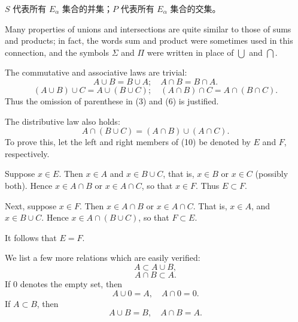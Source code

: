 \documentclass[../poma-notes.tex]{subfiles}
\begin{document}
\anote
$S$ 代表所有 $E_{\alpha}$ 集合的并集；$P$ 代表所有 $E_{\alpha}$ 集合的交集。

\begin{remarks}
  Many properties of unions and intersections are quite similar to those of sums and products; in fact,
  the words sum and product were sometimes used in this connection, and the symbols $\Sigma$ and $\Pi$
  were written in place of $\bigcup$ and $\bigcap$.

  The commutative and associative laws are trivial:
  \begin{equation}
    A \cup B = B \cup A; \quad A \cap B = B \cap A.
  \end{equation}
  \begin{equation}
    (A \cup B) \cup C = A \cup (B \cup C); \quad (A \cap B) \cap C = A \cap (B \cap C).
  \end{equation}
  Thus the omission of parenthese in (3) and (6) is justified.

  The distributive law also holds:
  \begin{equation}
    A \cap (B \cup C) = (A \cap B) \cup (A \cap C).
  \end{equation}
  To prove this, let the left and right members of (10) be denoted by $E$ and $F$, respectively.

  Suppose $x \in E$. Then $x \in A$ and $x \in B \cup C$, that is, $x \in B$ or $x \in C$ (possibly both).
  Hence $x \in A \cap B$ or $x \in A \cap C$, so that $x \in F$. Thus $E \subset F$.

  Next, suppose $x \in F$. Then $x \in A \cap B$ or $x \in A \cap C$. That is, $x \in A$, and
  $x \in B \cup C$. Hence $x \in A \cap (B \cup C)$, so that $F \subset E$.

  It follows that $E = F$.

  We list a few more relations which are easily verified:
  \begin{equation}
    A \subset A \cup B,
  \end{equation}
  \begin{equation}
    A \cap B \subset A.
  \end{equation}
  If 0 denotes the empty set, then
  \begin{equation}
    A \cup 0 = A, \quad A \cap 0 = 0.
  \end{equation}
  If $A \subset B$, then
  \begin{equation}
    A \cup B = B, \quad A \cap B = A.
  \end{equation}
\end{remarks}
\end{document}
